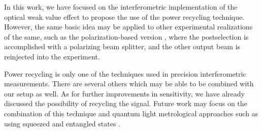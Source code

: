 In this work, we have focused on the interferometric implementation of the optical weak value effect to propose the use of the power recycling technique.  However, the same basic idea may be applied to other experimental realizations of the same, such as the polarization-based version \cite{Hosten2008}, where the postselection is accomplished with a polarizing beam splitter, and the other output beam is reinjected into the experiment.

Power recycling is only one of the techniques used in precision interferometric measurements. There are several others which may be able to be combined with our setup as well.  As for further improvements in sensitivity, we have already discussed the possibility of recycling the signal.  Future work may focus on the combination of this technique and quantum light metrological approaches such as using squeezed and entangled states \cite{Caves1981,Treps2002}.


%
%
